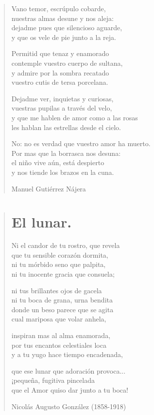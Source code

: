 \documentclass[12pt, twoside]{book}
\begin{document}
\begin{verse}
Vano temor, escrúpulo cobarde,\\
nuestras almas desune y nos aleja:\\
dejadme pues que silencioso aguarde,\\
y que os vele de pie junto a la reja.
\newline

Permitid que tenaz y enamorado\\
contemple vuestro cuerpo de sultana,\\
y admire por la sombra recatado\\
vuestro cutis de tersa porcelana.
\newline

Dejadme ver, inquietas y curiosas,\\
vuestras pupilas a través del velo,\\
y que me hablen de amor como a las rosas\\
les hablan las estrellas desde el cielo.
\newline

No: no es verdad que vuestro amor ha muerto.\\
Por mas que la borrasca nos desuna:\\
el niño vive aún, está despierto\\
y nos tiende los brazos en la cuna.
\newline

Manuel Gutiérrez Nájera
\end{verse}

\newpage
\begin{verse}
\begin{center}
\section{El lunar.}
\end{center}
Ni el candor de tu rostro, que revela\\
que tu sensible corazón dormita,\\
ni tu mórbido seno que palpita,\\
ni tu inocente gracia que consuela;
\newline

ni tus brillantes ojos de gacela\\
ni tu boca de grana, urna bendita\\
donde un beso parece que se agita\\
cual mariposa que volar anhela,
\newline

inspiran mas al alma enamorada,\\
por tus encantos celestiales loca\\
y a tu yugo hace tiempo encadenada,
\newline

que ese lunar que adoración provoca...\\
¡pequeña, fugitiva pincelada\\
que el Amor quiso dar junto a tu boca!
\newline

Nicolás Augusto González (1858-1918)
\end{verse}
\newpage
\end{document}
